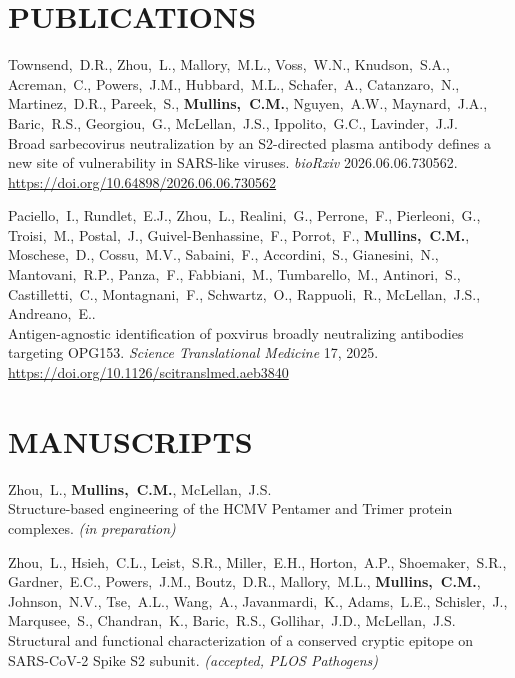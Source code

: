 \documentclass[11pt]{article}
\begin{document}
\section*{PUBLICATIONS}

{\small\begin{enumerate}[label={[\arabic*]}, itemsep=3pt]

\item Townsend,~D.R., Zhou,~L., Mallory,~M.L., Voss,~W.N., Knudson,~S.A., Acreman,~C.,
  Powers,~J.M., Hubbard,~M.L., Schafer,~A., Catanzaro,~N., Martinez,~D.R., Pareek,~S.,
  \textbf{Mullins,~C.M.}, Nguyen,~A.W., Maynard,~J.A., Baric,~R.S., Georgiou,~G.,
  McLellan,~J.S., Ippolito,~G.C., Lavinder,~J.J.\\
  Broad sarbecovirus neutralization by an S2-directed plasma antibody defines a new site of vulnerability in SARS-like viruses.
  \textit{bioRxiv} 2026.06.06.730562.
  {\small\color{dimgray}\url{https://doi.org/10.64898/2026.06.06.730562}}

\item Paciello,~I., Rundlet,~E.J., Zhou,~L., Realini,~G., Perrone,~F., Pierleoni,~G., Troisi,~M., Postal,~J., Guivel-Benhassine,~F., Porrot,~F., \textbf{Mullins,~C.M.}, Moschese,~D., Cossu,~M.V., Sabaini,~F., Accordini,~S., Gianesini,~N., Mantovani,~R.P., Panza,~F., Fabbiani,~M., Tumbarello,~M., Antinori,~S., Castilletti,~C., Montagnani,~F., Schwartz,~O., Rappuoli,~R., McLellan,~J.S., Andreano,~E..\\
  Antigen-agnostic identification of poxvirus broadly neutralizing antibodies targeting OPG153.
  \textit{Science Translational Medicine} 17, 2025.
  {\small\color{dimgray}\url{https://doi.org/10.1126/scitranslmed.aeb3840}}

\end{enumerate}}


\section*{MANUSCRIPTS}

{\small\begin{enumerate}[leftmargin=*, label={[\arabic*]}, itemsep=3pt]

\item Zhou,~L., \textbf{Mullins,~C.M.}, McLellan,~J.S.\\
  Structure-based engineering of the HCMV Pentamer and Trimer protein complexes.
  \textit{(in preparation)}

\item Zhou,~L., Hsieh,~C.L., Leist,~S.R., Miller,~E.H., Horton,~A.P., Shoemaker,~S.R., Gardner,~E.C., Powers,~J.M., Boutz,~D.R., Mallory,~M.L., \textbf{Mullins,~C.M.}, Johnson,~N.V., Tse,~A.L., Wang,~A., Javanmardi,~K., Adams,~L.E., Schisler,~J., Marqusee,~S., Chandran,~K., Baric,~R.S., Gollihar,~J.D., McLellan,~J.S.\\
  Structural and functional characterization of a conserved cryptic epitope on SARS-CoV-2 Spike S2 subunit.
  \textit{(accepted, PLOS Pathogens)}

\end{enumerate}}
\end{document}
